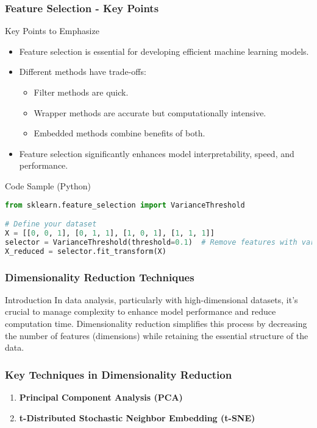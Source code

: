 \documentclass[aspectratio=169]{beamer}
\begin{document}
\begin{frame}[fragile]
    \frametitle{Feature Selection - Key Points}
    \begin{block}{Key Points to Emphasize}
        \begin{itemize}
            \item Feature selection is essential for developing efficient machine learning models.
            \item Different methods have trade-offs:
            \begin{itemize}
                \item Filter methods are quick.
                \item Wrapper methods are accurate but computationally intensive.
                \item Embedded methods combine benefits of both.
            \end{itemize}
            \item Feature selection significantly enhances model interpretability, speed, and performance.
        \end{itemize}
    \end{block}
    
    \begin{block}{Code Sample (Python)}
        \begin{lstlisting}[language=Python]
from sklearn.feature_selection import VarianceThreshold

# Define your dataset
X = [[0, 0, 1], [0, 1, 1], [1, 0, 1], [1, 1, 1]]
selector = VarianceThreshold(threshold=0.1)  # Remove features with variance below this threshold
X_reduced = selector.fit_transform(X)
        \end{lstlisting}
    \end{block}
\end{frame}

\begin{frame}[fragile]
    \frametitle{Dimensionality Reduction Techniques}
    \begin{block}{Introduction}
        In data analysis, particularly with high-dimensional datasets, it's crucial to manage complexity to enhance model performance and reduce computation time. Dimensionality reduction simplifies this process by decreasing the number of features (dimensions) while retaining the essential structure of the data.
    \end{block}
\end{frame}

\begin{frame}[fragile]
    \frametitle{Key Techniques in Dimensionality Reduction}
    \begin{enumerate}
        \item \textbf{Principal Component Analysis (PCA)}
        \item \textbf{t-Distributed Stochastic Neighbor Embedding (t-SNE)}
    \end{enumerate}
\end{frame}
\end{document}
